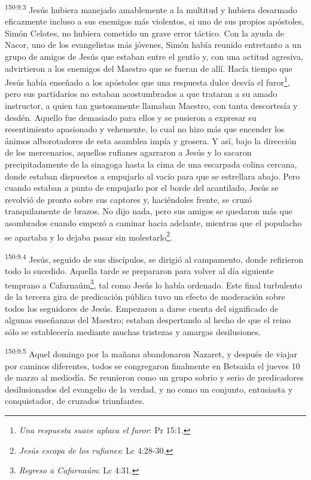 \par 
\textsuperscript{150:9.3} Jesús hubiera manejado amablemente a la multitud y hubiera desarmado eficazmente incluso a sus enemigos más violentos, si uno de sus propios apóstoles, Simón Celotes, no hubiera cometido un grave error táctico. Con la ayuda de Nacor, uno de los evangelistas más jóvenes, Simón había reunido entretanto a un grupo de amigos de Jesús que estaban entre el gentío y, con una actitud agresiva, advirtieron a los enemigos del Maestro que se fueran de allí. Hacía tiempo que Jesús había enseñado a los apóstoles que una respuesta dulce desvía el furor\footnote{\textit{Una respuesta suave aplaca el furor}: Pr 15:1.}, pero sus partidarios no estaban acostumbrados a que trataran a su amado instructor, a quien tan gustosamente llamaban Maestro, con tanta descortesía y desdén. Aquello fue demasiado para ellos y se pusieron a expresar su resentimiento apasionado y vehemente, lo cual no hizo más que encender los ánimos alborotadores de esta asamblea impía y grosera. Y así, bajo la dirección de los mercenarios, aquellos rufianes agarraron a Jesús y lo sacaron precipitadamente de la sinagoga hasta la cima de una escarpada colina cercana, donde estaban dispuestos a empujarlo al vacío para que se estrellara abajo. Pero cuando estaban a punto de empujarlo por el borde del acantilado, Jesús se revolvió de pronto sobre sus captores y, haciéndoles frente, se cruzó tranquilamente de brazos. No dijo nada, pero sus amigos se quedaron más que asombrados cuando empezó a caminar hacia adelante, mientras que el populacho se apartaba y lo dejaba pasar sin molestarlo\footnote{\textit{Jesús escapa de los rufianes}: Lc 4:28-30.}.

\par 
\textsuperscript{150:9.4} Jesús, seguido de sus discípulos, se dirigió al campamento, donde refirieron todo lo sucedido. Aquella tarde se prepararon para volver al día siguiente temprano a Cafarnaúm\footnote{\textit{Regreso a Cafarnaúm}: Lc 4:31.}, tal como Jesús lo había ordenado. Este final turbulento de la tercera gira de predicación pública tuvo un efecto de moderación sobre todos los seguidores de Jesús. Empezaron a darse cuenta del significado de algunas enseñanzas del Maestro; estaban despertando al hecho de que el reino sólo se establecería mediante muchas tristezas y amargas desilusiones.

\par 
\textsuperscript{150:9.5} Aquel domingo por la mañana abandonaron Nazaret, y después de viajar por caminos diferentes, todos se congregaron finalmente en Betsaida el jueves 10 de marzo al mediodía. Se reunieron como un grupo sobrio y serio de predicadores desilusionados del evangelio de la verdad, y no como un conjunto, entusiasta y conquistador, de cruzados triunfantes.